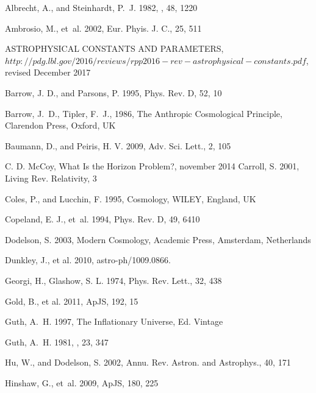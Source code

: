 \documentclass{rmaa}
\begin{document}
\begin{thebibliography}

 Albrecht, A., and {Steinhardt,} P.~J. 1982, \prl, 48,  1220  

Ambrosio, M., et~al. 2002, Eur. Phyis. J. C., 25, 511  

 ASTROPHYSICAL CONSTANTS AND PARAMETERS,\\ \footnotesize{$http://pdg.lbl.gov/2016/reviews/rpp2016-rev-astrophysical-constants.pdf$}, revised December 2017

Barrow, J. D., and {Parsons}, P. 1995, Phys. Rev. D, 52, 10 
  
Barrow, J.~D., Tipler, F.~J., 1986, The Anthropic Cosmological Principle,
  Clarendon Press, Oxford, UK 

 Baumann, D., and  {Peiris,} H. V. 2009, Adv. Sci. Lett., 2, 105

C. D. McCoy, What Is the Horizon Problem?, november 2014
Carroll, S. 2001, Living Rev. Relativity, 3
   
Coles, P., and Lucchin, F. 1995, Cosmology, WILEY, England, UK 

  Copeland, E. J., et~al. 1994, Phys. Rev. D, 49, 6410

Dodelson, S. 2003, Modern Cosmology, Academic Press, Amsterdam, Netherlands 

  Dunkley, J.,  et al. 2010, astro-ph/1009.0866. 
 
Georgi, H., Glashow, S. L. 1974, Phys. Rev. Lett., 32, 438
 
Gold, B., et al. 2011, ApJS, 192, 15

Guth, A.~H. 1997, The Inflationary Universe,  Ed. Vintage
        
Guth, A.~H. 1981, \prd, 23,  347 

Hu, W., and {Dodelson,} S. 2002, Annu. Rev. Astron. and Astrophys., 40, 171 
 
Hinshaw, G., et~al. 2009, ApJS, 180, 225


\end{thebibliography}
\end{document}
